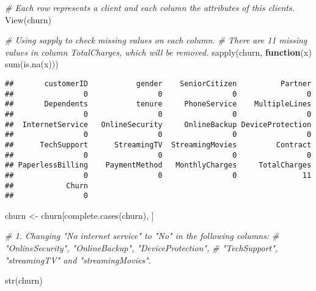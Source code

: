 \documentclass[
]{article}
\newenvironment{Shaded}{\begin{snugshade}}{\end{snugshade}}
\newcommand{\CommentTok}[1]{\textcolor[rgb]{0.56,0.35,0.01}{\textit{#1}}}
\newcommand{\ControlFlowTok}[1]{\textcolor[rgb]{0.13,0.29,0.53}{\textbf{#1}}}
\newcommand{\FunctionTok}[1]{\textcolor[rgb]{0.00,0.00,0.00}{#1}}
\newcommand{\NormalTok}[1]{#1}
\newcommand{\OtherTok}[1]{\textcolor[rgb]{0.56,0.35,0.01}{#1}}
\begin{document}
\begin{Shaded}
\begin{Highlighting}[]
\CommentTok{\# Each row represents a client and each column the attributes of this clients.}
\FunctionTok{View}\NormalTok{(churn)}

\CommentTok{\# Using sapply to check missing values on each column.}
\CommentTok{\# There are 11 missing values in column \textquotesingle{}TotalCharges\textquotesingle{}, which will be removed.}
\FunctionTok{sapply}\NormalTok{(churn, }\ControlFlowTok{function}\NormalTok{(x) }\FunctionTok{sum}\NormalTok{(}\FunctionTok{is.na}\NormalTok{(x)))}
\end{Highlighting}
\end{Shaded}

\begin{verbatim}
##       customerID           gender    SeniorCitizen          Partner 
##                0                0                0                0 
##       Dependents           tenure     PhoneService    MultipleLines 
##                0                0                0                0 
##  InternetService   OnlineSecurity     OnlineBackup DeviceProtection 
##                0                0                0                0 
##      TechSupport      StreamingTV  StreamingMovies         Contract 
##                0                0                0                0 
## PaperlessBilling    PaymentMethod   MonthlyCharges     TotalCharges 
##                0                0                0               11 
##            Churn 
##                0
\end{verbatim}

\begin{Shaded}
\begin{Highlighting}[]
\NormalTok{churn }\OtherTok{\textless{}{-}}\NormalTok{ churn[}\FunctionTok{complete.cases}\NormalTok{(churn), ]}

\CommentTok{\# 1. Changing "No internet service" to "No" in the following columns: }
\CommentTok{\# "OnlineSecurity", "OnlineBackup", "DeviceProtection",}
\CommentTok{\# "TechSupport", "streamingTV" and "streamingMovies".}

\FunctionTok{str}\NormalTok{(churn)}
\end{Highlighting}
\end{Shaded}
\end{document}

